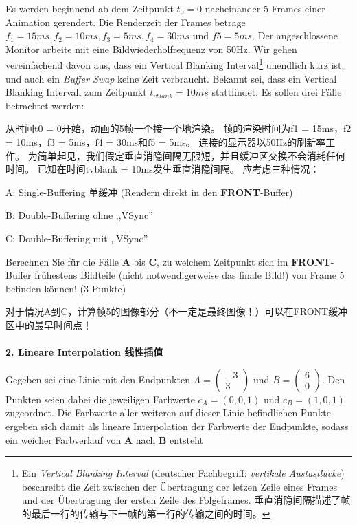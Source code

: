 \documentclass[fleqn]{article}
\begin{document}
Es werden beginnend ab dem Zeitpunkt $t_0 = 0$ nacheinander 5 Frames einer Animation gerendert. 
 Die Renderzeit der Frames betrage $f_1 = 15ms, f_2 = 10ms, f_3 = 5ms, f_4 = 30ms$ und $f5 = 5ms$.
 Der angeschlossene Monitor arbeite mit eine Bildwiederholfrequenz von 50Hz. 
 Wir gehen vereinfachend davon aus, dass ein Vertical Blanking Interval\footnote{Ein \textit{Vertical Blanking Interval} (deutscher Fachbegriff: \textit{vertikale Austastlücke}) beschreibt die Zeit zwischen der Übertragung der letzen Zeile eines Frames und der Übertragung der ersten Zeile des Folgeframes. 垂直消隐间隔描述了帧的最后一行的传输与下一帧的第一行的传输之间的时间。} unendlich kurz ist, und auch ein \textit{Buffer Swap} keine Zeit verbraucht. Bekannt sei, dass ein Vertical Blanking Intervall zum Zeitpunkt $t_{vblank} = 10ms$ stattfindet. Es sollen drei Fälle betrachtet werden:

从时间t0 = 0开始，动画的5帧一个接一个地渲染。 帧的渲染时间为f1 = 15ms，f2 = 10ms，f3 = 5ms，f4 = 30ms和f5 = 5ms。 连接的显示器以50Hz的刷新率工作。 为简单起见，我们假定垂直消隐间隔无限短，并且缓冲区交换不会消耗任何时间。 已知在时间tvblank = 10ms发生垂直消隐间隔。 应考虑三种情况：

 A: Single-Buffering 单缓冲 (Rendern direkt in den \textbf{FRONT}-Buffer) 
 
 B: Double-Buffering ohne ,,VSync'' 
 
 C: Double-Buffering mit ,,VSync''

Berechnen Sie für die Fälle \textbf{A} bis \textbf{C}, zu welchem Zeitpunkt sich im \textbf{FRONT}-Buffer frühestens Bildteile (nicht notwendigerweise das finale Bild!) von Frame 5 befinden können! (3 Punkte)

对于情况A到C，计算帧5的图像部分（不一定是最终图像！）可以在FRONT缓冲区中的最早时间点！
\\
\\
\noindent\textbf{2. Lineare Interpolation 线性插值}

Gegeben sei eine Linie mit den Endpunkten $A=\begin{pmatrix}
    -3\\3
\end{pmatrix}$ und $B=\begin{pmatrix}
    6\\0
\end{pmatrix}$.
Den Punkten seien dabei die jeweiligen Farbwerte $c_A = (0, 0, 1)$ und $c_B = (1, 0, 1)$ zugeordnet. Die Farbwerte aller weiteren auf dieser Linie befindlichen Punkte ergeben sich damit als lineare Interpolation der Farbwerte der Endpunkte, sodass ein weicher Farbverlauf von \textbf{A} nach \textbf{B} entsteht
\end{document}

